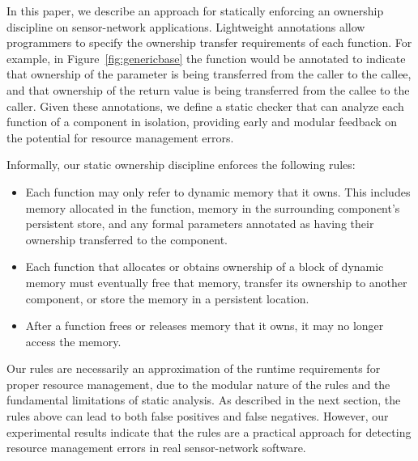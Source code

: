 
%

In this paper, we describe an approach for statically enforcing an
ownership discipline on sensor-network applications.  Lightweight
annotations allow programmers to specify the ownership transfer
requirements of each function.  For example, in
Figure~\ref{fig:genericbase} the  function would be
annotated to indicate that ownership of the  parameter
is being transferred from the caller to the callee, and that ownership
of the return value is being transferred from the callee to the
caller.  Given these annotations, we define a static checker that can
analyze each function of a component in isolation, providing early and
modular feedback on the potential for resource management errors.

Informally, our static ownership discipline
enforces the following rules:
%
\begin{itemize}
%
\item Each function may only refer to dynamic memory that it owns.  This
  includes memory allocated in the function, memory in the surrounding
  component's persistent store, and any formal parameters annotated as
  having their ownership transferred to the component.
%
\item Each function that allocates or obtains ownership of a block of
  dynamic memory 
must eventually free that memory, transfer its ownership to another 
component, or store the memory in a persistent location.
%
\item After a function frees or releases memory that it owns, 
it may no longer access the memory.
%
\end{itemize}

Our rules are necessarily an approximation of the runtime
requirements for proper resource management, due to the modular nature
of the rules and the fundamental limitations of static analysis.  
As described in the next
section, the rules above can lead to both false positives and false
negatives.  However, our experimental results indicate that the rules
are a practical approach for detecting resource management errors in
real sensor-network software.


